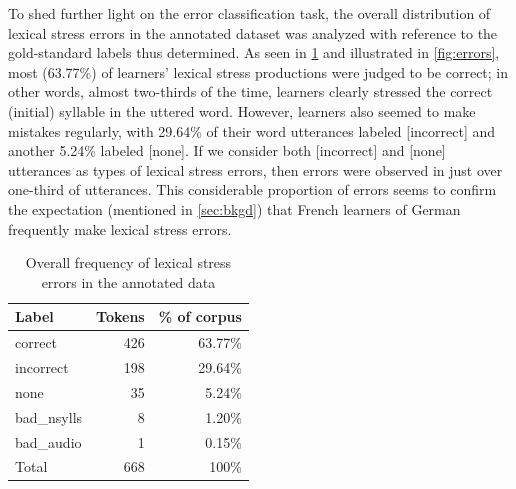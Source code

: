 \documentclass[a4paper]{article}
\begin{document}
		To shed further light on the error classification task, the overall distribution of lexical stress errors in the annotated dataset 
		was analyzed with reference to the gold-standard labels thus determined.
		As seen in \cref{tab:errors} and illustrated in \cref{fig:errors}, 
		most (63.77\%) of learners' lexical stress productions were judged to be correct; in other words, almost two-thirds of the time, learners clearly stressed the correct (initial) syllable in the uttered word.
		However, learners also seemed to make mistakes regularly, with 29.64\% of their word utterances labeled [incorrect] and another 5.24\% labeled [none].
		If we consider both [incorrect] and [none] utterances as types of lexical stress errors, then errors were observed in just over one-third of utterances. %
		This considerable proportion of errors seems to confirm the expectation (mentioned in \cref{sec:bkgd}) that French learners of German frequently make lexical stress errors.
		
		\begin{table}
			\centering
			\caption{Overall frequency of lexical stress errors in the annotated data}
			\begin{tabular}{lrr}
			\toprule
			Label & Tokens & \% of corpus \\
			\midrule
			correct	& 426	& 63.77\% \\
			incorrect &	198	& 29.64\% \\
			none	 &35 &	5.24\% \\
			bad\_nsylls	& 8	& 1.20\% \\
			bad\_audio	& 1	& 0.15\%\\
			\midrule
			Total & 668 & 100\%\\
			\bottomrule
			\end{tabular}
			\label{tab:errors}
		\end{table}
		
\end{document}
